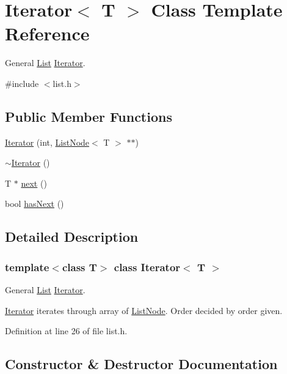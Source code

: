 \hypertarget{classIterator}{}\section{Iterator$<$ T $>$ Class Template Reference}
\label{classIterator}


General \hyperlink{classList}{List} \hyperlink{classIterator}{Iterator}.  




{\ttfamily \#include $<$list.\+h$>$}

\subsection*{Public Member Functions}
\begin{DoxyCompactItemize}
\item 
\hyperlink{classIterator_a122e81da6e3abb757bf28195e9db9d59}{Iterator} (int, \hyperlink{classListNode}{List\+Node}$<$ T $>$ $\ast$$\ast$)
\item 
\hyperlink{classIterator_ae3ca5d592c9550743e6bfe07e5881c13}{$\sim$\+Iterator} ()
\item 
T $\ast$ \hyperlink{classIterator_a8c2ebf7ddd9230ec2d50ec7c57ea8fca}{next} ()
\item 
bool \hyperlink{classIterator_a69b4bebf4a915a4ee591e6c8bd9b9b9a}{has\+Next} ()
\end{DoxyCompactItemize}


\subsection{Detailed Description}
\subsubsection*{template$<$class T$>$\newline
class Iterator$<$ T $>$}

General \hyperlink{classList}{List} \hyperlink{classIterator}{Iterator}. 

\hyperlink{classIterator}{Iterator} iterates through array of \hyperlink{classListNode}{List\+Node}. Order decided by order given. 

Definition at line 26 of file list.\+h.



\subsection{Constructor \& Destructor Documentation}
\mbox{\label{classIterator_a122e81da6e3abb757bf28195e9db9d59}} 
